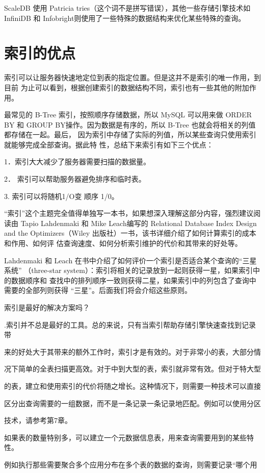 ScaleDB 使用 Patricia tries（这个词不是拼写错误），其他一些存储引擎技术如 InfiniDB
和 Infobright则使用了一些特殊的数据结构来优化某些特殊的查询。

\section{索引的优点}
索引可以让服务器快速地定位到表的指定位置。但是这并不是索引的唯一作用，到目前
为止可以看到，根据创建索引的数据结构不同，索引也有一些其他的附加作用。

最常见的 B-Tree 索引，按照顺序存储数据，所以 MySQL 可以用来做 ORDER BY 和 GROUP
BY操作。因为数据是有序的，所以 B-Tree 也就会将相关的列值都存储在一起。最后，
因为索引中存储了实际的列值，所以某些查询只使用索引就能够完成全部查询。据此特
性，总结下来索引有如下三个优点：

1．索引大大减少了服务器需要扫描的数据量。

2． 索引可以帮助服务器避免排序和临时表。

3. 索引可以将随机1/O变 顺序 1/0。

“索引”这个主题完全值得单独写一本书，如果想深入理解这部分内容，强烈建议阅
读由 Tapio Lahdenmaki 和 Mike Leach编写的 Relational Database Index Design and the
Optimizers（Wiley 出版社）一书，该书详细介绍了如何计算索引的成本和作用、如何评
估查询速度、如何分析索引维护的代价和其带来的好处等。

Lahdenmaki 和 Leach 在书中介绍了如何评价一个索引是否适合某个查询的“三星系统”
（three-star system）：索引将相关的记录放到一起则获得一星，如果索引中的数据顺序和
查找中的排列顺序一致则获得二星，如果索引中的列包含了查询中需要的全部列则获得
“三星”。后面我们将会介绍这些原则。

索引是最好的解决方案吗？

.索引并不总是最好的工具。总的来说，只有当索引帮助存储引擎快速查找到记录带

来的好处大于其带来的额外工作时，索引才是有效的。对于非常小的表，大部分情

况下简单的全表扫描更高效。对于中到大型的表，索引就非常有效。但对于特大型

的表，建立和使用索引的代价将随之增长。这种情况下，则需要一种技术可以直接

区分出查询需要的一组数据，而不是一条记录一条记录地匹配。例如可以使用分区

技术，请参考第7章。

如果表的数量特别多，可以建立一个元数据信息表，用来查询需要用到的某些特性。

例如执行那些需要聚合多个应用分布在多个表的数据的查询，则需要记录“哪个用

